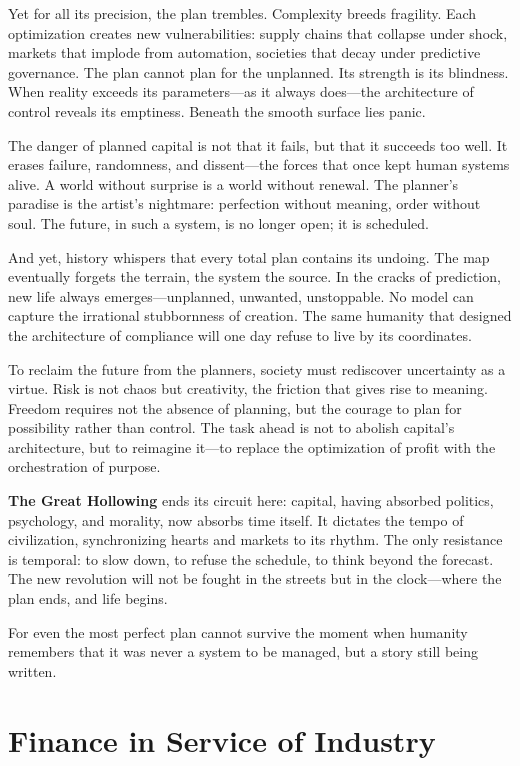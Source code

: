 \documentclass[11pt,twoside]{book}
\begin{document}
Yet for all its precision, the plan trembles.  Complexity breeds fragility.  Each optimization creates new vulnerabilities: supply chains that collapse under shock, markets that implode from automation, societies that decay under predictive governance.  The plan cannot plan for the unplanned.  Its strength is its blindness.  When reality exceeds its parameters—as it always does—the architecture of control reveals its emptiness.  Beneath the smooth surface lies panic.

The danger of planned capital is not that it fails, but that it succeeds too well.  It erases failure, randomness, and dissent—the forces that once kept human systems alive.  A world without surprise is a world without renewal.  The planner’s paradise is the artist’s nightmare: perfection without meaning, order without soul.  The future, in such a system, is no longer open; it is scheduled.

And yet, history whispers that every total plan contains its undoing.  The map eventually forgets the terrain, the system the source.  In the cracks of prediction, new life always emerges—unplanned, unwanted, unstoppable.  No model can capture the irrational stubbornness of creation.  The same humanity that designed the architecture of compliance will one day refuse to live by its coordinates.

To reclaim the future from the planners, society must rediscover uncertainty as a virtue.  Risk is not chaos but creativity, the friction that gives rise to meaning.  Freedom requires not the absence of planning, but the courage to plan for possibility rather than control.  The task ahead is not to abolish capital’s architecture, but to reimagine it—to replace the optimization of profit with the orchestration of purpose.

\textbf{The Great Hollowing} ends its circuit here: capital, having absorbed politics, psychology, and morality, now absorbs time itself.  It dictates the tempo of civilization, synchronizing hearts and markets to its rhythm.  The only resistance is temporal: to slow down, to refuse the schedule, to think beyond the forecast.  The new revolution will not be fought in the streets but in the clock—where the plan ends, and life begins.

For even the most perfect plan cannot survive the moment when humanity remembers that it was never a system to be managed, but a story still being written.

% 
\chapter{Finance in Service of Industry}
\label{ch:36}
\end{document}
